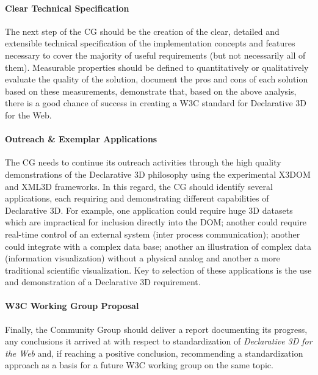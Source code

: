 \documentclass[review]{acmsiggraph}
\begin{document}
\paragraph{Clear Technical Specification}
The next step of the CG should be the creation of the clear, detailed and extensible technical specification of the implementation concepts and features necessary to cover the majority of useful requirements (but not necessarily all of them). Measurable properties should be defined to quantitatively or qualitatively evaluate the quality of the solution, document the pros and cons of each solution based on these measurements, demonstrate that, based on the above analysis, there is a good chance of success in creating a W3C standard for Declarative 3D for the Web.

\paragraph{Outreach \& Exemplar Applications}
The CG needs to continue its outreach activities through the high quality demonstrations of the Declarative 3D philosophy using the experimental X3DOM and XML3D frameworks. %
In this regard, the CG should identify several applications, each requiring and demonstrating different capabilities of Declarative 3D. For example, one application could require huge 3D datasets which are impractical for inclusion directly into the DOM; another could require real-time control of an external system (inter process communication); another could integrate with a complex data base; another an illustration of complex data (information visualization) without a physical analog and another a more traditional scientific visualization. Key to selection of these applications is the use and demonstration of a Declarative 3D requirement.

\paragraph{W3C Working Group Proposal}
Finally, the Community Group should deliver a report documenting its progress, any conclusions it arrived at with respect to standardization of \textit{Declarative 3D for the Web} and, if reaching a positive conclusion, recommending a standardization approach as a basis for a future W3C working group on the same topic.
\end{document}
